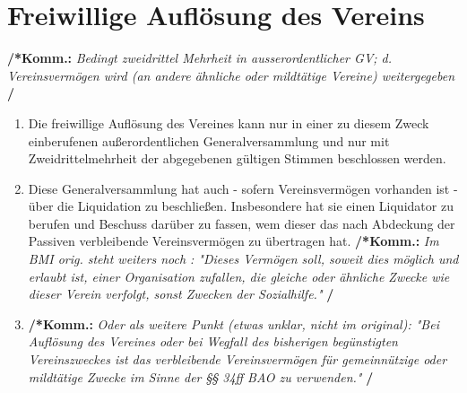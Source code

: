 \documentclass[a4paper,12pt]{article}
\newcommand{\comment}[1]{{\bf /*Komm.:} \textit{#1} {\bf */}}
\begin{document}
\section{Freiwillige Auflösung des Vereins} %
\comment{Bedingt zweidrittel Mehrheit in ausserordentlicher GV; d. Vereinsvermögen wird (an andere ähnliche oder mildtätige Vereine)  weitergegeben}
\begin{enumerate}
\item Die freiwillige Auflösung des Vereines kann nur in einer zu diesem Zweck einberufenen außerordentlichen Generalversammlung und nur mit Zweidrittelmehrheit der abgegebenen gültigen Stimmen beschlossen werden.
\item Diese Generalversammlung hat auch - sofern Vereinsvermögen vorhanden ist - über die Liquidation zu beschließen. Insbesondere hat sie einen Liquidator zu berufen und Beschuss darüber zu fassen, wem dieser das nach Abdeckung der Passiven verbleibende Vereinsvermögen zu übertragen hat.
\comment{Im BMI orig. steht weiters noch : "Dieses Vermögen soll, soweit dies möglich und erlaubt ist, einer Organisation zufallen, die gleiche oder ähnliche Zwecke wie dieser Verein verfolgt, sonst Zwecken der Sozialhilfe."}

\item \comment{Oder als weitere Punkt (etwas unklar, nicht im original): "Bei Auflösung des Vereines oder bei Wegfall des bisherigen begünstigten Vereinszweckes ist das verbleibende Vereinsvermögen für gemeinnützige oder mildtätige Zwecke im Sinne der §§ 34ff BAO zu verwenden."}

\end{enumerate}
\end{document}
